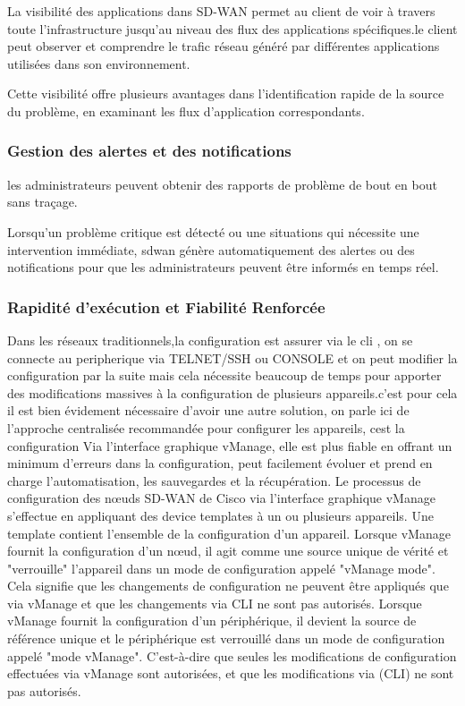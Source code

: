 La visibilité des applications dans SD-WAN permet au client de voir à travers toute l'infrastructure jusqu'au niveau des flux des applications spécifiques.le client peut observer et comprendre le trafic réseau généré par différentes applications utilisées dans son environnement. 

Cette visibilité offre plusieurs avantages dans  l’identification rapide  de la source du problème, en examinant les flux d'application correspondants.

\subsubsection{Gestion des alertes et des notifications   }

les administrateurs peuvent obtenir des rapports de problème de bout en bout sans traçage.

Lorsqu'un problème critique est détecté  ou une situations qui nécessite  une intervention immédiate, sdwan génère automatiquement des alertes ou des notifications pour que les administrateurs peuvent être informés en temps réel.

\subsubsection{Rapidité d’exécution et Fiabilité Renforcée  }
Dans les réseaux traditionnels,la configuration est assurer via le cli , on se connecte au peripherique via TELNET/SSH ou CONSOLE et on peut modifier la configuration par la suite mais cela nécessite beaucoup de temps pour apporter des modifications massives à la configuration de plusieurs appareils.c’est pour cela il est bien évidement nécessaire d’avoir une autre solution, on parle ici de l'approche centralisée recommandée pour configurer les appareils, cest la configuration Via l'interface graphique vManage, elle est plus fiable en offrant un minimum d’erreurs dans la configuration, peut facilement évoluer et prend en charge l'automatisation, les sauvegardes et la récupération.
Le processus de configuration des nœuds SD-WAN de Cisco via l'interface graphique vManage s'effectue en appliquant des device templates à un ou plusieurs appareils. Une template  contient l'ensemble de la configuration d'un appareil. Lorsque vManage fournit la configuration d'un nœud, il agit comme une source unique de vérité et "verrouille" l'appareil dans un mode de configuration appelé "vManage mode". Cela signifie que les changements de configuration ne peuvent être appliqués que via vManage et que les changements via CLI ne sont pas autorisés.   
Lorsque vManage fournit  la configuration d'un périphérique, il devient la source de référence unique et le périphérique est verrouillé dans un mode de configuration appelé "mode vManage". C’est-à-dire  que seules les modifications de configuration effectuées via vManage sont autorisées, et que les modifications via (CLI) ne sont pas autorisés.

